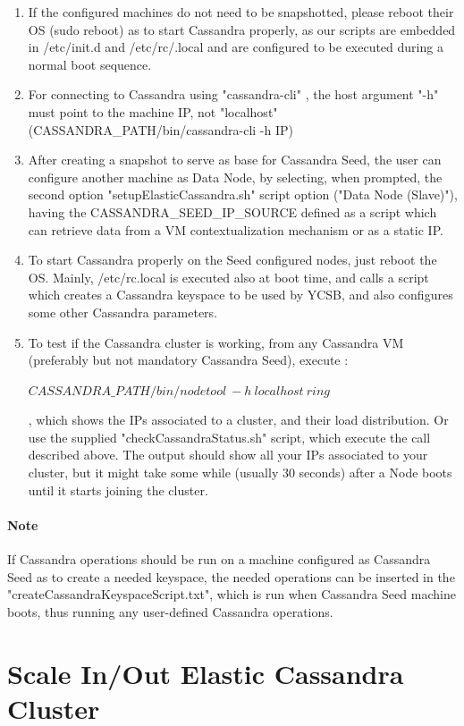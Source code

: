 \documentclass[10pt]{report}
\begin{document}
\begin{enumerate}
 \item If the configured machines do not need to be snapshotted, please reboot their OS (sudo reboot) as to start Cassandra properly, as our scripts are embedded in /etc/init.d and /etc/rc/.local and are configured to be executed during a normal boot sequence.
 \item For connecting to Cassandra using "cassandra-cli" , the host argument "-h" must point to the machine IP, not "localhost" (CASSANDRA\_PATH/bin/cassandra-cli -h IP)
 \item After creating a snapshot to serve as base for Cassandra Seed, the user can configure another machine as Data Node, by selecting, when prompted, the second option "setupElasticCassandra.sh" script option ("Data Node (Slave)"), having the CASSANDRA\_SEED\_IP\_SOURCE defined as a script which can retrieve data from a VM contextualization mechanism or as a static IP.  
 \item To start Cassandra properly on the Seed configured nodes, just reboot the OS. Mainly, /etc/rc.local is executed also at boot time, and calls a script which creates a Cassandra keyspace to be used by YCSB, and also configures some other Cassandra parameters.
 \item To test if the Cassandra cluster is working, from any Cassandra VM (preferably but not mandatory Cassandra Seed), execute :
 
  $CASSANDRA\_PATH/bin/nodetool~-h~localhost~ring$
  
  ,  which shows the IPs associated to a cluster, and their load distribution. Or use the supplied "checkCassandraStatus.sh" script, which execute the call described above. The output should show all your IPs associated to your cluster, but it might take some while (usually 30 seconds) after a Node boots until it starts joining the cluster. 
 \end{enumerate} 

\paragraph{Note}
 If Cassandra operations should be run on a machine configured as Cassandra Seed as to create a needed keyspace, the needed operations can be inserted in the "createCassandraKeyspaceScript.txt", which is run when Cassandra Seed machine boots, thus running any user-defined Cassandra operations. 

\section{Scale In/Out Elastic Cassandra Cluster}
\end{document}
